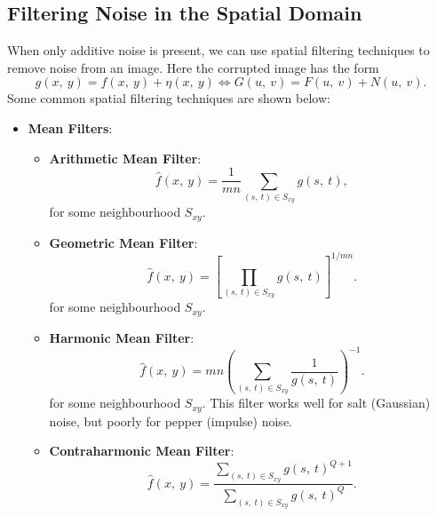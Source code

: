 \documentclass{article}
\begin{document}
\subsection{Filtering Noise in the Spatial Domain}
When only additive noise is present, we can use spatial filtering
techniques to remove noise from an image. Here the corrupted image has
the form
\begin{equation*}
    g\left( x,\: y \right) = f\left( x,\: y \right) + \eta\left( x,\: y \right) \iff G\left( u,\: v \right) = F\left( u,\: v \right) + N\left( u,\: v \right).
\end{equation*}
Some common spatial filtering techniques are shown below:
\begin{itemize}
    \item \textbf{Mean Filters}:
          \begin{itemize}
              \item \textbf{Arithmetic Mean Filter}:
                    \begin{equation*}
                        \hat{f}\left( x,\: y \right) = \frac{1}{mn} \sum_{\left( s,\: t \right) \in S_{xy}} g\left( s,\: t \right),
                    \end{equation*}
                    for some neighbourhood \(S_{xy}\).
              \item \textbf{Geometric Mean Filter}:
                    \begin{equation*}
                        \hat{f}\left( x,\: y \right) = \left[ \prod_{\left( s,\: t \right) \in S_{xy}} g\left( s,\: t \right) \right]^{1/mn}.
                    \end{equation*}
                    for some neighbourhood \(S_{xy}\).
              \item \textbf{Harmonic Mean Filter}:
                    \begin{equation*}
                        \hat{f}\left( x,\: y \right) = mn \left( \sum_{\left( s,\: t \right) \in S_{xy}} \frac{1}{g\left( s,\: t \right)} \right)^{-1}.
                    \end{equation*}
                    for some neighbourhood \(S_{xy}\). This filter works well for
                    salt (Gaussian) noise, but poorly for pepper (impulse) noise.
              \item \textbf{Contraharmonic Mean Filter}:
                    \begin{equation*}
                        \hat{f}\left( x,\: y \right) = \frac{\sum_{\left( s,\: t \right) \in S_{xy}} g\left( s,\: t \right)^{Q + 1}}{\sum_{\left( s,\: t \right) \in S_{xy}} g\left( s,\: t \right)^Q}.

\end{equation*}
\end{itemize}
\end{itemize}
\end{document}
